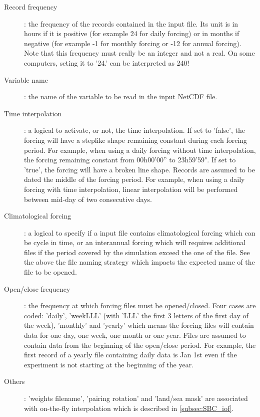 \documentclass[../main/NEMO_manual]{subfiles}
\begin{document}
\begin{description}
\item[Record frequency]:
  the frequency of the records contained in the input file.
  Its unit is in hours if it is positive (for example 24 for daily forcing) or in months if negative
  (for example -1 for monthly forcing or -12 for annual forcing).
  Note that this frequency must really be an integer and not a real.
  On some computers, seting it to '24.' can be interpreted as 240!

\item[Variable name]:
  the name of the variable to be read in the input NetCDF file.

\item[Time interpolation]:
  a logical to activate, or not, the time interpolation.
  If set to 'false', the forcing will have a steplike shape remaining constant during each forcing period.
  For example, when using a daily forcing without time interpolation, the forcing remaining constant from
  00h00'00'' to 23h59'59".
  If set to 'true', the forcing will have a broken line shape.
  Records are assumed to be dated the middle of the forcing period.
  For example, when using a daily forcing with time interpolation,
  linear interpolation will be performed between mid-day of two consecutive days. 

\item[Climatological forcing]:
  a logical to specify if a input file contains climatological forcing which can be cycle in time,
  or an interannual forcing which will requires additional files if
  the period covered by the simulation exceed the one of the file.
  See the above the file naming strategy which impacts the expected name of the file to be opened. 

\item[Open/close frequency]:
  the frequency at which forcing files must be opened/closed.
  Four cases are coded:
  'daily', 'weekLLL' (with 'LLL' the first 3 letters of the first day of the week), 'monthly' and 'yearly' which
  means the forcing files will contain data for one day, one week, one month or one year.
  Files are assumed to contain data from the beginning of the open/close period.
  For example, the first record of a yearly file containing daily data is Jan 1st even if
  the experiment is not starting at the beginning of the year. 

\item[Others]:
  'weights filename', 'pairing rotation' and 'land/sea mask' are associated with
  on-the-fly interpolation which is described in \autoref{subsec:SBC_iof}.

\end{description}
\end{document}
